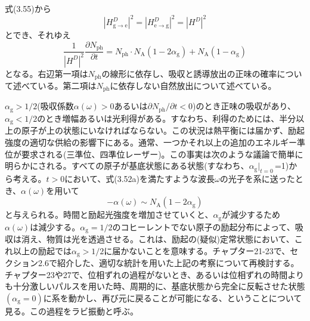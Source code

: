 \documentclass[11pt,a4j,uplatex]{jsarticle}
\begin{document}
式(3.55)から
\begin{equation}
  \left|H_{\mathrm{g\to e}}^D\right|^2=\left|H_{\mathrm{e\to g}}^D\right|^2=\left|H^D\right|^2\tag{3.62}
\end{equation}
とでき、それゆえ
\begin{equation}
  \frac{1}{\left|H^D\right|^2}\frac{\partial N_{\mathrm{ph}}}{\partial t}=N_{\mathrm{ph}}\cdot N_{\mathrm{A}}(1-2\alpha_{\mathrm{g}})+N_{\mathrm{A}}(1-\alpha_{\mathrm{g}})\tag{3.63}
\end{equation}
となる。右辺第一項は$N_{\mathrm{ph}}$の線形に依存し、吸収と誘導放出の正味の確率について述べている。第二項は$N_{\mathrm{ph}}$に依存しない自然放出について述べている。

$\alpha_{\mathrm{g}}>1/2$(吸収係数$\alpha(\omega)>0$あるいは$\partial N_{\mathrm{ph}}/\partial t<0$)のとき正味の吸収があり、$\alpha_{\mathrm{g}}<1/2$のとき増幅あるいは光利得がある。すなわち、利得のためには、半分以上の原子が上の状態にいなければならない。この状況は熱平衡には届かず、励起強度の適切な供給の影響下にある。通常、一つかそれ以上の追加のエネルギー準位が要求される(三準位、四準位レーザー)。この事実は次のような議論で簡単に明らかにされる。すべての原子が基底状態にある状態(すなわち、$\alpha_{\mathrm{g}}|_{t=0}$\,=1)から考える。$t>0$において、式(3.52a)を満たすような波長$\omega$の光子を系に送ったとき、$\alpha(\omega)$を用いて
\begin{equation}
  -\alpha(\omega)\sim N_{\mathrm{A}}(1-2\alpha_{\mathrm{g}})\tag{3.64}
\end{equation}
と与えられる。時間と励起光強度を増加させていくと、$\alpha_{\mathrm{g}}$が減少するため$\alpha(\omega)$は減少する。$\alpha_{\mathrm{g}}=1/2$のコヒーレントでない原子の励起分布によって、吸収は消え、物質は光を透過させる。これは、励起の(疑似)定常状態において、これ以上の励起では$\alpha_{\mathrm{g}}>1/2$に届かないことを意味する。チャプター21-23で、セクション2.6で紹介した、適切な統計を用いた上記の考察について再検討する。チャプター23や27で、位相ずれの過程がないとき、あるいは位相ずれの時間よりも十分激しいパルスを用いた時、周期的に、基底状態から完全に反転させた状態$(\alpha_{\mathrm{g}}=0)$に系を動かし、再び元に戻ることが可能になる、ということについて見る。この過程をラビ振動と呼ぶ。
\end{document}

